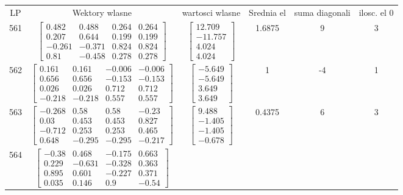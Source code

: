 \documentclass[a4paper,12pt]{article}
\begin{document}
\bgroup {} \vspace{0.2in} \begin{tabular}{c c c c c c}
LP &Wektory wlasne & wartosci wlasne & Srednia el & suma diagonali & ilosc. el 0\\
561
&
$\begin{bmatrix} 0.482 & 0.488 & 0.264 & 0.264 \\ 0.207 & 0.644 & 0.199 & 0.199 \\ -0.261 & -0.371 & 0.824 & 0.824 \\ 0.81 & -0.458 & 0.278 & 0.278 \end{bmatrix}$
&
$\begin{bmatrix} 12.709 \\ -11.757 \\ 4.024 \\ 4.024 \end{bmatrix}$
&
1.6875
&
9
&
3
\\
562
&
$\begin{bmatrix} 0.161 & 0.161 & -0.006 & -0.006 \\ 0.656 & 0.656 & -0.153 & -0.153 \\ 0.026 & 0.026 & 0.712 & 0.712 \\ -0.218 & -0.218 & 0.557 & 0.557 \end{bmatrix}$
&
$\begin{bmatrix} -5.649 \\ -5.649 \\ 3.649 \\ 3.649 \end{bmatrix}$
&
1
&
-4
&
1
\\
563
&
$\begin{bmatrix} -0.268 & 0.58 & 0.58 & -0.23 \\ 0.03 & 0.453 & 0.453 & 0.827 \\ -0.712 & 0.253 & 0.253 & 0.465 \\ 0.648 & -0.295 & -0.295 & -0.217 \end{bmatrix}$
&
$\begin{bmatrix} 9.488 \\ -1.405 \\ -1.405 \\ -0.678 \end{bmatrix}$
&
0.4375
&
6
&
3
\\
564
&
$\begin{bmatrix} -0.38 & 0.468 & -0.175 & 0.663 \\ 0.229 & -0.631 & -0.328 & 0.363 \\ 0.895 & 0.601 & -0.227 & 0.371 \\ 0.035 & 0.146 & 0.9 & -0.54 \end{bmatrix}$

\end{tabular}
\end{document}
